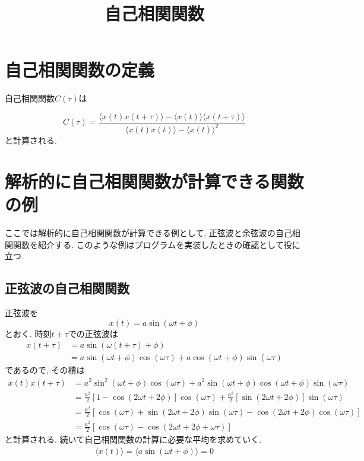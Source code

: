 





\title{自己相関関数}
\maketitle

\section{自己相関関数の定義}
自己相関関数$C(\tau)$は

\begin{equation}
    C(\tau)
    =
    \frac{\langle x(t) x(t + \tau) \rangle - \langle x(t) \rangle \langle x(t + \tau) \rangle}{\langle x(t) x(t) \rangle - \langle x(t) \rangle^{2}}
\end{equation}
と計算される.

\section{解析的に自己相関関数が計算できる関数の例}
ここでは解析的に自己相関関数が計算できる例として, 正弦波と余弦波の自己相関関数を紹介する.
このような例はプログラムを実装したときの確認として役に立つ.

\subsection{正弦波の自己相関関数}
正弦波を
\begin{equation}
    x(t) = a \sin(\omega t + \phi)
\end{equation}
とおく.
時刻$t+\tau$での正弦波は
\begin{align}
    x(t+\tau)
    &= a \sin(\omega (t + \tau) + \phi) \\
    &= a \sin(\omega t + \phi) \cos(\omega \tau)
     + a \cos(\omega t + \phi) \sin(\omega \tau)
\end{align}
であるので, その積は
\begin{align}
    x(t) x(t + \tau)
    &=
    a^{2} \sin^{2}(\omega t + \phi) \cos(\omega \tau) +
    a^{2} \sin(\omega t + \phi) \cos(\omega t + \phi) \sin(\omega \tau) \\
    &=
    \frac{a^{2}}{2} [1 - \cos(2\omega t + 2\phi)] \cos(\omega \tau) +
    \frac{a^{2}}{2} [\sin(2\omega t + 2\phi)] \sin(\omega \tau) \\
    &=
    \frac{a^{2}}{2}
    [ \cos(\omega \tau)
    + \sin(2\omega t + 2\phi)\sin(\omega \tau)
    - \cos(2\omega t + 2\phi)\cos(\omega \tau)] \\
    &=
    \frac{a^{2}}{2}
    [\cos(\omega \tau) - \cos (2\omega t + 2\phi + \omega \tau)]
\end{align}
と計算される.
続いて自己相関関数の計算に必要な平均を求めていく.
\begin{align}
    \langle x(t) \rangle = \langle a \sin(\omega t + \phi) \rangle = 0
\end{align}

